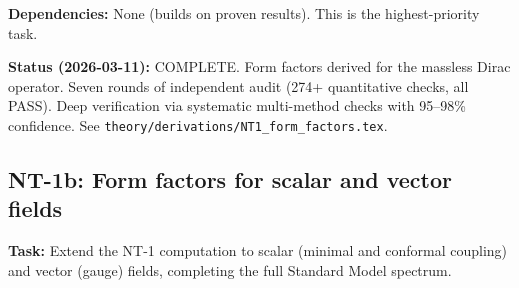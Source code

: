\documentclass[12pt,a4paper]{article}
\newcommand{\task}[1]{\noindent\textbf{Task:} #1\par}
\newcommand{\deps}[1]{\noindent\textbf{Dependencies:} #1\par}
\begin{document}
\deps{None (builds on proven results). This is the highest-priority task.}

\textbf{Status (2026-03-11):} \textcolor{proven}{COMPLETE.} Form factors derived
for the massless Dirac operator. Seven rounds of independent audit (274+
quantitative checks, all PASS). Deep verification via systematic multi-method checks
with 95--98\% confidence. See \texttt{theory/derivations/NT1\_form\_factors.tex}.

\subsection{NT-1b: Form factors for scalar and vector fields}
\label{task:NT1b}

\task{Extend the NT-1 computation to scalar (minimal and conformal coupling)
and vector (gauge) fields, completing the full Standard Model spectrum.}
\end{document}
